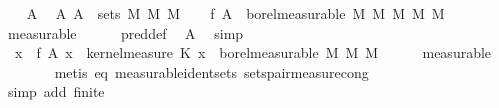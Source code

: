 \begin{isabellebody}
\isanewline
\ \ \isamarkupfalse%
\ A{\isacharprime}{\kern0pt}\ \isamarkupfalse%
\ A{\isacharprime}{\kern0pt}{\isacharcolon}{\kern0pt}\ {\isachardoublequoteopen}A{\isacharprime}{\kern0pt}\ {\isasymin}\ sets\ {\isacharparenleft}{\kern0pt}{\isacharquery}{\kern0pt}M{}\ {\isasymOtimes}\isactrlsub M\ {\isacharquery}{\kern0pt}M{}{\isacharparenright}{\kern0pt}{\isachardoublequoteclose}\isanewline
\ \ \isamarkupfalse%
\ {\isachardoublequoteopen}{\isacharquery}{\kern0pt}f\ A{\isacharprime}{\kern0pt}\ {\isasymin}\ borel{\isacharunderscore}{\kern0pt}measurable\ {\isacharparenleft}{\kern0pt}{\isacharparenleft}{\kern0pt}{\isacharquery}{\kern0pt}M{}\ {\isasymOtimes}\isactrlsub M\ {\isacharquery}{\kern0pt}M{}{\isacharparenright}{\kern0pt}\ {\isasymOtimes}\isactrlsub M\ {\isacharquery}{\kern0pt}M{}{\isacharparenright}{\kern0pt}{\isachardoublequoteclose}\isanewline
\ \ \ \ \isamarkupfalse%
\ measurable\isanewline
\ \ \ \ \isamarkupfalse%
\ pred{\isacharunderscore}{\kern0pt}def\ \isamarkupfalse%
\ A{\isacharprime}{\kern0pt}\ \isamarkupfalse%
\ simp\isanewline
\ \ \isamarkupfalse%
\ \isamarkupfalse%
\ {\isachardoublequoteopen}{\isacharparenleft}{\kern0pt}{\isasymlambda}\ x{\isachardot}{\kern0pt}\ {\isasymintegral}\isactrlsup {\isacharplus}{\kern0pt}{\isasymomega}\ {\isacharquery}{\kern0pt}f\ A{\isacharprime}{\kern0pt}\ {\isacharparenleft}{\kern0pt}x{\isacharcomma}{\kern0pt}\ {\isasymomega}\ {\isasympartial}kernel{\isacharunderscore}{\kern0pt}measure\ K{\isacharunderscore}{\kern0pt}{}\ x{\isacharparenright}{\kern0pt}\ {\isasymin}\ borel{\isacharunderscore}{\kern0pt}measurable\ {\isacharparenleft}{\kern0pt}{\isacharquery}{\kern0pt}M{}\ {\isasymOtimes}\isactrlsub M\ {\isacharquery}{\kern0pt}M{}{\isacharparenright}{\kern0pt}{\isachardoublequoteclose}\isanewline
\ \ \ \ \isamarkupfalse%
\ measurable\isanewline
\ \ \ \ \ \ \isamarkupfalse%
\ {\isacharparenleft}{\kern0pt}metis\ eq\ measurable{\isacharunderscore}{\kern0pt}ident{\isacharunderscore}{\kern0pt}sets\ sets{\isacharunderscore}{\kern0pt}pair{\isacharunderscore}{\kern0pt}measure{\isacharunderscore}{\kern0pt}cong{\isacharparenright}{\kern0pt}\isanewline
\ \ \ \ \ \ \isamarkupfalse%
\ {\isacharparenleft}{\kern0pt}simp\ add{\isacharcolon}{\kern0pt}\ finite{\isacharparenleft}{\kern0pt}{}{\isacharparenright}{\kern0pt}{\isacharparenright}{\kern0pt}\isanewline

\end{isabellebody}
